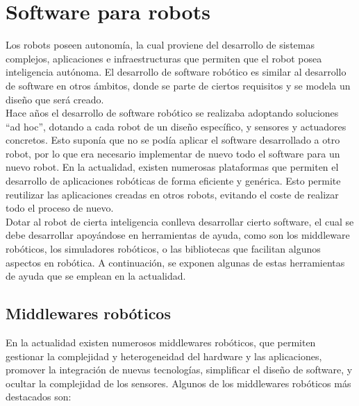 \section{Software para robots}
Los robots poseen autonomía, la cual proviene del desarrollo de sistemas complejos, aplicaciones e infraestructuras que permiten que el robot posea inteligencia autónoma. El desarrollo de software robótico es similar al desarrollo de software en otros ámbitos, donde se parte de ciertos requisitos y se modela un diseño que será creado.\\

Hace años el desarrollo de software robótico se realizaba adoptando soluciones ``ad hoc'', dotando a cada robot de un diseño específico, y sensores y actuadores concretos. Esto suponía que no se podía aplicar el software desarrollado a otro robot, por lo que era necesario implementar de nuevo todo el software para un nuevo robot. En la actualidad, existen numerosas plataformas que permiten el desarrollo de aplicaciones robóticas de forma eficiente y genérica. Esto permite reutilizar las aplicaciones creadas en otros robots, evitando el coste de realizar todo el proceso de nuevo.\\

Dotar al robot de cierta inteligencia conlleva desarrollar cierto software, el cual se debe desarrollar apoyándose en herramientas de ayuda, como son los middleware robóticos, los simuladores robóticos, o las  bibliotecas que facilitan algunos aspectos en robótica. A continuación, se exponen algunas de estas herramientas de ayuda que se emplean en la actualidad.

\subsection{Middlewares robóticos}
En la actualidad existen numerosos middlewares robóticos, que permiten gestionar la complejidad y heterogeneidad del hardware y las aplicaciones, promover la integración de nuevas tecnologías, simplificar el diseño de software, y ocultar la complejidad de los sensores. Algunos de los middlewares robóticos más destacados son:

